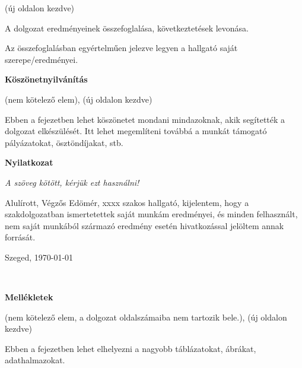 \documentclass[a4paper,12pt]{report}
\theoremstyle{definition}
\theoremstyle{remark}
\begin{document}
(új oldalon kezdve)

A dolgozat eredményeinek összefoglalása, következtetések levonása.

Az összefoglalásban egyértelműen jelezve legyen a hallgató saját szerepe/eredményei.

\newpage


 

\newpage
{\Huge \bf Köszönetnyilvánítás}


\vspace{2 cm}

(nem kötelező elem), (új oldalon kezdve) 

Ebben a fejezetben lehet köszönetet mondani mindazoknak, akik segítették a dolgozat elkészülését. Itt lehet megemlíteni továbbá a munkát támogató pályázatokat, ösztöndíjakat, stb.

\newpage
{\Huge \bf Nyilatkozat}


\vspace{2 cm}

{\it A szöveg kötött, kérjük ezt használni!}

Alulírott, Végzős Edömér, xxxx szakos hallgató, kijelentem, hogy a szakdolgozatban ismertetettek saját munkám eredményei, és minden felhasznált, nem saját munkából származó eredmény esetén hivatkozással jelöltem annak forrását. 


\begin{flushleft}
\vspace*{1cm}
Szeged, \today
\end{flushleft}

\begin{flushright}
 \vspace*{1cm}
 \makebox[7cm]{\rule{6cm}{.4pt}}\\
\end{flushright}

\pagebreak

\newpage
{\Huge \bf Mellékletek}


\vspace{2 cm}

(nem kötelező elem, a dolgozat oldalszámaiba nem tartozik bele.), (új oldalon kezdve)

Ebben a fejezetben lehet elhelyezni a nagyobb táblázatokat, ábrákat, adathalmazokat.
\end{document}

